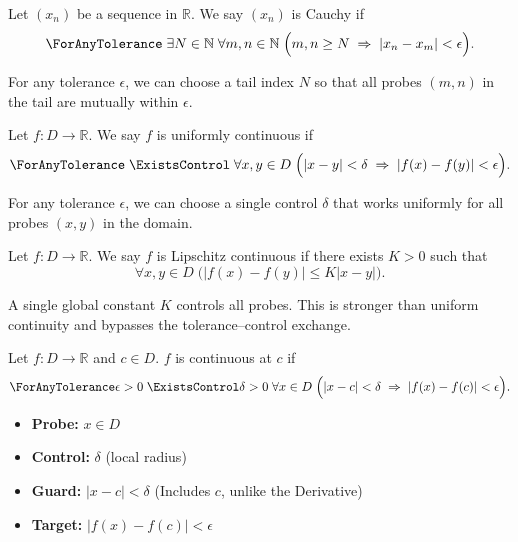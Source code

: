 \begin{definition}
Let $(x_n)$ be a sequence in $\mathbb{R}$. We say $(x_n)$ is Cauchy if
\[
\ForAnyTolerance\;\exists N \in \mathbb{N}\;\forall m,n \in \mathbb{N}\;
\Big(
m,n \geq N
\;\Rightarrow\;
|x_n - x_m| < \epsilon
\Big).
\]

\begin{remark*}[Interpretation]
For any tolerance $\epsilon$, we can choose a tail index $N$ so that all probes $(m,n)$ in the tail are mutually within $\epsilon$.
\end{remark*}
\end{definition}


\begin{definition}
Let $f : D \to \mathbb{R}$. We say $f$ is uniformly continuous if
\[
\ForAnyTolerance\;\ExistsControl\;\forall x,y \in D\;
\Big(
|x - y| < \delta
\;\Rightarrow\;
|f(x) - f(y)| < \epsilon
\Big).
\]

\begin{remark*}[Interpretation]
For any tolerance $\epsilon$, we can choose a single control $\delta$ that works uniformly for all probes $(x,y)$ in the domain.
\end{remark*}
\end{definition}


\begin{definition}
Let $f : D \to \mathbb{R}$. We say $f$ is Lipschitz continuous if there exists $K > 0$ such that
\[
\forall x,y \in D\;
\big(
|f(x) - f(y)| \leq K |x - y|
\big).
\]

\begin{remark*}[Interpretation]
A single global constant $K$ controls all probes. This is stronger than uniform continuity and bypasses the tolerance–control exchange.
\end{remark*}
\end{definition}

\begin{definition}
Let $f : D \to \mathbb{R}$ and $c \in D$. $f$ is continuous at $c$ if 
\[
\ForAnyTolerance \epsilon > 0 \; \ExistsControl \delta > 0 \; \forall x \in D \; 
\Big( |x - c| < \delta \;\Rightarrow\; |f(x) - f(c)| < \epsilon \Big).
\]
\begin{itemize}
    \item \textbf{Probe:} $x \in D$
    \item \textbf{Control:} $\delta$ (local radius)
    \item \textbf{Guard:} $|x - c| < \delta$ (Includes $c$, unlike the Derivative)
    \item \textbf{Target:} $|f(x) - f(c)| < \epsilon$
\end{itemize}
\end{definition}

